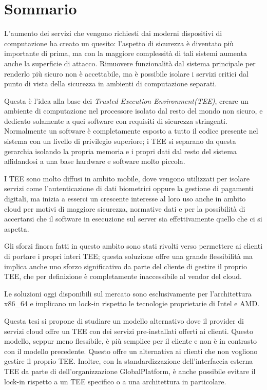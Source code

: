 \documentclass[12pt,italian]{report}
\begin{document}
\frontespizio
\afterpreface

\chapter*{Sommario}
\label{cap:sommario}
L'aumento dei servizi che vengono richiesti dai moderni dispositivi di
computazione ha creato un quesito: l'aspetto di sicurezza è diventato più
importante di prima, ma con la maggiore complessità di tali sistemi aumenta
anche la superficie di attacco.
Rimuovere funzionalità dal sistema principale per renderlo più sicuro non
è accettabile, ma è possibile isolare i servizi critici dal punto di vista
della sicurezza in ambienti di computazione separati.

Questa è l'idea alla base dei \textit{Trusted Execution Environment(TEE)},
creare un ambiente di computazione nel processore isolato dal resto del
mondo non sicuro\cite{sabt2015tee}, e dedicato solamente a quei software
con requisiti di sicurezza stringenti.
Normalmente un software è completamente esposto a tutto il codice
presente nel sistema con un livello di privilegio superiore;
i TEE si separano da questa gerarchia isolando la propria memoria e i propri
dati dal resto del sistema affidandosi a una base hardware e software
molto piccola.

I TEE sono molto diffusi in ambito mobile, dove vengono utilizzati per
isolare servizi come l'autenticazione di dati biometrici\cite{androidbiometrics}
oppure la gestione di pagamenti digitali\cite{secure_payments}, ma inizia a esserci
un crescente interesse al loro
uso anche in ambito cloud\cite{confidential_computing_consortium} per
motivi di maggiore sicurezza,
normative dati e  per la possibilità di accertarsi che il software
in esecuzione sul server sia effettivamente quello che ci si aspetta.

Gli sforzi finora fatti in questo ambito sono stati rivolti verso permettere
ai clienti di portare i propri interi TEE; questa soluzione offre una grande
flessibilità ma implica anche uno sforzo significativo da parte del cliente
di gestire il proprio TEE, che per definizione è completamente inaccessibile
al vendor del cloud.

Le soluzioni oggi disponibili sul mercato sono esclusivamente per
l'architettura x86\_64 e implicano un lock-in rispetto le tecnologie
proprietarie di Intel e AMD.

Questa tesi si propone di studiare un modello alternativo dove il provider
di servizi cloud offre un TEE con dei servizi pre-installati offerti ai
clienti.
Questo modello, seppur meno flessibile, è più semplice per il cliente e non
è in contrasto con il modello precedente. Questo offre un alternativa
ai clienti che non vogliono gestire il proprio TEE.
Inoltre, con la standardizzazione dell'interfaccia esterna TEE da parte di
dell'organizzazione GlobalPlatform\cite{gp2020clientapi}, è anche possibile
evitare il lock-in rispetto a un TEE specifico o a una
architettura in particolare.
\end{document}
